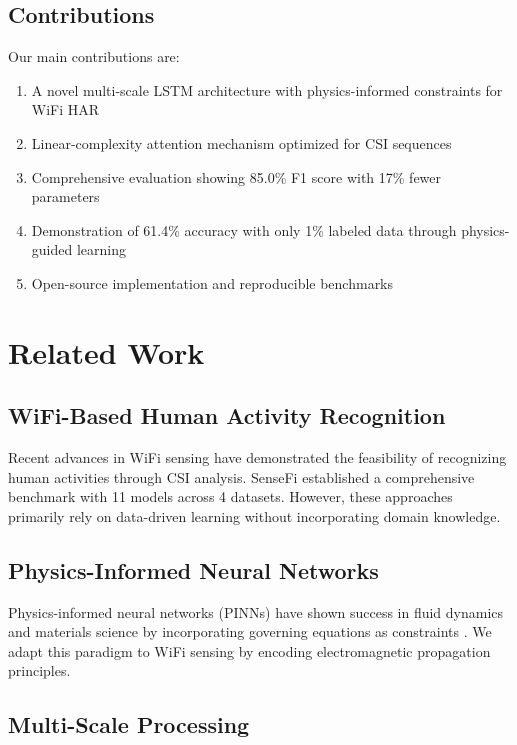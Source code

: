 \documentclass[10pt,conference]{IEEEtran}
\begin{document}
\subsection{Contributions}

Our main contributions are:
\begin{enumerate}
    \item A novel multi-scale LSTM architecture with physics-informed constraints for WiFi HAR
    \item Linear-complexity attention mechanism optimized for CSI sequences
    \item Comprehensive evaluation showing 85.0\% F1 score with 17\% fewer parameters
    \item Demonstration of 61.4\% accuracy with only 1\% labeled data through physics-guided learning
    \item Open-source implementation and reproducible benchmarks
\end{enumerate}

\section{Related Work}
\label{sec:related_work}

\subsection{WiFi-Based Human Activity Recognition}

Recent advances in WiFi sensing have demonstrated the feasibility of recognizing human activities through CSI analysis. SenseFi \cite{yang2023sensefi} established a comprehensive benchmark with 11 models across 4 datasets. However, these approaches primarily rely on data-driven learning without incorporating domain knowledge.

\subsection{Physics-Informed Neural Networks}

Physics-informed neural networks (PINNs) have shown success in fluid dynamics and materials science by incorporating governing equations as constraints \cite{raissi2019physics}. We adapt this paradigm to WiFi sensing by encoding electromagnetic propagation principles.

\subsection{Multi-Scale Processing}
\end{document}
